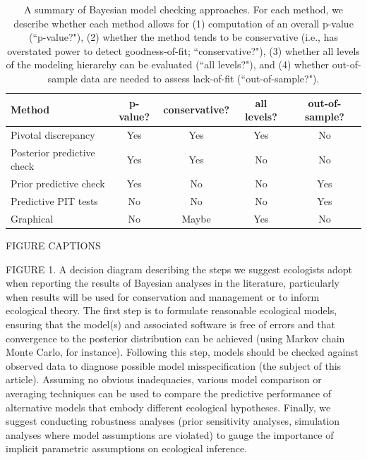 \documentclass[12pt,english]{article}
\begin{document}
\begin{spacing}{1.9}
\begin{table}[ht]
\caption{A summary of Bayesian model checking approaches.  For each method, we describe whether each method allows for (1) computation of an overall p-value (``p-value?"), (2) whether the method tends to be conservative (i.e., has overstated power to detect goodness-of-fit; ``conservative?"), (3) whether all levels of the modeling hierarchy can be evaluated (``all levels?"), and (4) whether out-of-sample data are needed to assess lack-of-fit (``out-of-sample?").
}
\label{tab:discrepancy}
\centering
\begin{tabular}{lcccc}
  \hline
  Method & p-value? & conservative? & all levels? & out-of-sample?  \\
  \hline
  Pivotal discrepancy & Yes & Yes & Yes & No \\
  Posterior predictive check & Yes & Yes & No & No \\
  Prior predictive check & Yes & No & No & Yes \\
  Predictive PIT tests & No & No & No & Yes \\
  Graphical & No & Maybe & Yes & No \\
\hline
\end{tabular}
\end{table}
\pagebreak

FIGURE CAPTIONS

FIGURE 1.  A decision diagram describing the steps we suggest ecologists adopt when reporting the results of Bayesian analyses in the literature, particularly when results will be used for conservation and management or to inform ecological theory.  The first step is to formulate reasonable ecological models, ensuring that the model(s) and associated software is free of errors and that convergence to the posterior distribution can be achieved (using Markov chain Monte Carlo, for instance).  Following this step, models should be checked against observed data to diagnose possible model misspecification (the subject of this article).  Assuming no obvious inadequacies, various model comparison or averaging techniques can be used to compare the predictive performance of alternative models that embody different ecological hypotheses.  Finally, we suggest conducting robustness analyses (prior sensitivity analyses, simulation analyses where model assumptions are violated) to gauge the importance of implicit parametric assumptions on ecological inference.


\end{spacing}
\end{document}
